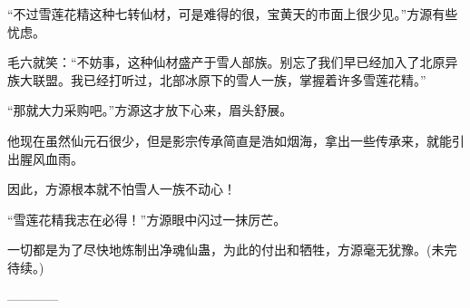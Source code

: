 \begin{this_body}
“不过雪莲花精这种七转仙材，可是难得的很，宝黄天的市面上很少见。”方源有些忧虑。

毛六就笑：“不妨事，这种仙材盛产于雪人部族。别忘了我们早已经加入了北原异族大联盟。我已经打听过，北部冰原下的雪人一族，掌握着许多雪莲花精。”

“那就大力采购吧。”方源这才放下心来，眉头舒展。

他现在虽然仙元石很少，但是影宗传承简直是浩如烟海，拿出一些传承来，就能引出腥风血雨。

因此，方源根本就不怕雪人一族不动心！

“雪莲花精我志在必得！”方源眼中闪过一抹厉芒。

一切都是为了尽快地炼制出净魂仙蛊，为此的付出和牺牲，方源毫无犹豫。(未完待续。)

------------

\end{this_body}

